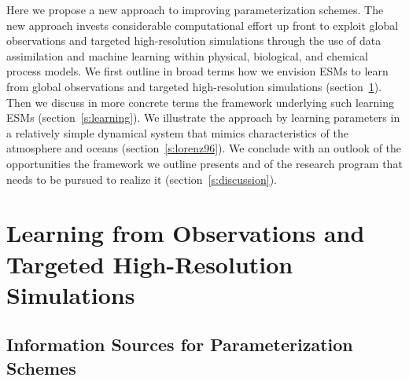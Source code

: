 \documentclass[draft]{agujournal}
\begin{document}
Here we propose a new approach to improving parameterization schemes. The new approach invests considerable computational effort up front to exploit global observations and targeted high-resolution simulations through the use of data assimilation and machine learning within physical, biological, and chemical process models. We first outline in broad terms how we envision ESMs to learn from global observations and targeted high-resolution simulations (section~\ref{s:overview}). Then we discuss in more concrete terms the framework underlying such learning ESMs (section~\ref{s:learning}). We illustrate the approach by learning parameters in a relatively simple dynamical system that mimics characteristics of the atmosphere and oceans (section~\ref{s:lorenz96}). We conclude with an outlook of the opportunities the framework we outline presents and of the research program that needs to be pursued to realize it (section~\ref{s:discussion}).

\section{Learning from Observations and Targeted High-Resolution Simulations}\label{s:overview}

\subsection{Information Sources for Parameterization Schemes}
\end{document}
